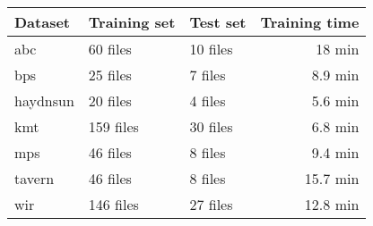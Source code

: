 \begin{tabular}{l|llr}
Dataset        & Training set & Test set & Training time \\ \hline
\gls{abc}      & 60  files            & 10 files        & 18 min        \\
\gls{bps}      & 25  files            & 7  files        & 8.9 min       \\
\gls{haydnsun} & 20  files            & 4  files        & 5.6 min       \\
\gls{kmt}      & 159 files            & 30 files        & 6.8 min       \\
\gls{mps}      & 46  files            & 8  files        & 9.4 min       \\
\gls{tavern}   & 46  files            & 8  files        & 15.7 min      \\
\gls{wir}      & 146 files            & 27 files        & 12.8 min     
\end{tabular}
